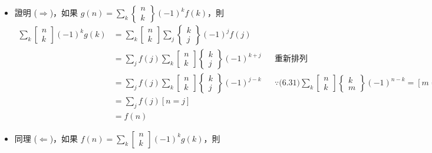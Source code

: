 \documentclass[11pt]{article}
\begin{document}
\begin{itemize}
	\item 證明 ($\Rightarrow$)，如果 $g(n) = \sum_{k} \begin{Bmatrix} n \\ k \end{Bmatrix} (-1)^{k} f(k)$，則
		\begin{align*}
			\sum_{k} \begin{bmatrix} n \\ k \end{bmatrix} (-1)^{k} g(k) 
				&=	\sum_{k} \begin{bmatrix} n \\ k \end{bmatrix} 
					\sum_j \begin{Bmatrix} k \\ j \end{Bmatrix}(-1)^j f(j)\\
				&=	\sum_{j} f(j) \sum_{k} \begin{bmatrix} n \\ k \end{bmatrix}
					\begin{Bmatrix} k \\ j \end{Bmatrix} (-1)^{k+j} 
						&& \text{重新排列}\\
				&=	\sum_{j} f(j) \sum_{k} \begin{bmatrix} n \\ k \end{bmatrix}
					\begin{Bmatrix} k \\ j \end{Bmatrix} (-1)^{j-k} 
						&& \because \text{(6.31)} 
						\sum_{k} \begin{bmatrix} n \\ k \end{bmatrix}
						\begin{Bmatrix} k \\ m \end{Bmatrix} (-1)^{n-k} = [m = n] \\
				&= \sum_{j} f(j) [n = j]\\
				&= f(n)
		\end{align*}
	\item 同理 ($\Leftarrow$)，如果 $f(n) = \sum_{k} \begin{bmatrix} n \\ k \end{bmatrix} (-1)^{k} g(k)$，則
		\begin{align*}

\end{align*}
\end{itemize}
\end{document}
